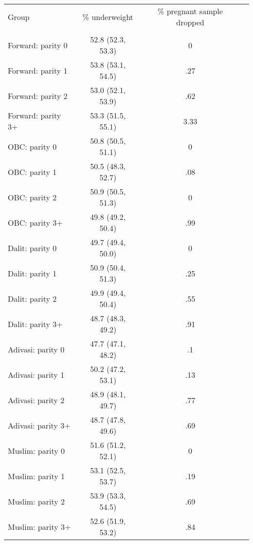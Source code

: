 \begin{tabular}{lccc}
\toprule
Group & \% underweight & \% pregnant sample dropped \\\\
\midrule
Forward: parity 0&52.8 (52.3, 53.3)&0\\
Forward: parity 1&53.8 (53.1, 54.5)&.27\\
Forward: parity 2&53.0 (52.1, 53.9)&.62\\
Forward: parity 3+&53.3 (51.5, 55.1)&3.33\\
OBC: parity 0&50.8 (50.5, 51.1)&0\\
OBC: parity 1&50.5 (48.3, 52.7)&.08\\
OBC: parity 2&50.9 (50.5, 51.3)&0\\
OBC: parity 3+&49.8 (49.2, 50.4)&.99\\
Dalit: parity 0&49.7 (49.4, 50.0)&0\\
Dalit: parity 1&50.9 (50.4, 51.3)&.25\\
Dalit: parity 2&49.9 (49.4, 50.4)&.55\\
Dalit: parity 3+&48.7 (48.3, 49.2)&.91\\
Adivasi: parity 0&47.7 (47.1, 48.2)&.1\\
Adivasi: parity 1&50.2 (47.2, 53.1)&.13\\
Adivasi: parity 2&48.9 (48.1, 49.7)&.77\\
Adivasi: parity 3+&48.7 (47.8, 49.6)&.69\\
Muslim: parity 0&51.6 (51.2, 52.1)&0\\
Muslim: parity 1&53.1 (52.5, 53.7)&.19\\
Muslim: parity 2&53.9 (53.3, 54.5)&.69\\
Muslim: parity 3+&52.6 (51.9, 53.2)&.84\\
\bottomrule
\end{tabular}
